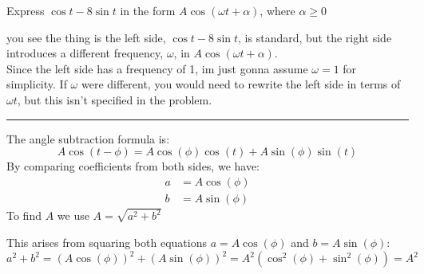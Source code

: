 \documentclass[a4paper, 12pt]{report}
\begin{document}
    \newpage
    \begin{tcolorbox}[title=\color{black}{\section{Q4}}, colback=white, colframe=black!30!white, boxrule=0.4mm, width=1\textwidth]
        Express \( \cos t-8 \sin t \) in the form \( A \cos (\omega t+\alpha) \), where \( \alpha \geq 0 \)
    \end{tcolorbox}
    you see the thing is the left side, \( \cos t - 8 \sin t \), is standard, but the right side introduces a different frequency, \( \omega \), in \( A \cos (\omega t + \alpha) \).\\[10pt]
    Since the left side has a frequency of 1, im just gonna assume \( \omega = 1 \) for simplicity. If \( \omega \) were different, you would need to rewrite the left side in terms of \( \omega t \), but this isn't specified in the problem.\\
    \vspace{0.5em}\hrule\vspace{0.5em}
    The angle subtraction formula is:
    \[A \cos(t - \phi) = A \cos(\phi) \cos(t) + A \sin(\phi) \sin(t)\]
    By comparing coefficients from both sides, we have:
    \begin{align*}
        a & = A \cos(\phi) \\
        b & = A \sin(\phi)
    \end{align*}
    To find $A$ we use $A = \sqrt{a^2 + b^2}$\\
    \vspace*{1em}
    \begin{minipage}{0.45\textwidth}\centering
        This arises from squaring both equations \(a = A \cos(\phi)\) and \(b = A \sin(\phi)\):\\[1em]
        $a^2 + b^2 = (A \cos(\phi))^2 + (A \sin(\phi))^2 = A^2 (\cos^2(\phi) + \sin^2(\phi)) = A^2$
    \end{minipage}\\
    
\end{document}
